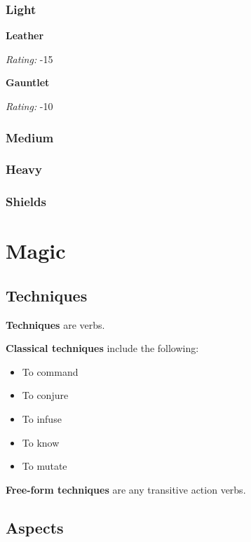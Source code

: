 \documentclass[12pt,]{article}
\providecommand{\tightlist}{%
  \setlength{\itemsep}{0pt}\setlength{\parskip}{0pt}}
\begin{document}
\subsubsection{Light}\label{light}

\textbf{Leather}

\emph{Rating:} -15

\textbf{Gauntlet}

\emph{Rating:} -10

\subsubsection{Medium}\label{medium}

\subsubsection{Heavy}\label{heavy}

\subsubsection{Shields}\label{shields}

\section{Magic}\label{magic}

\subsection{Techniques}\label{techniques}

\textbf{Techniques} are verbs.

\textbf{Classical techniques} include the following:

\begin{itemize}
\tightlist
\item
  To command
\item
  To conjure
\item
  To infuse
\item
  To know
\item
  To mutate
\end{itemize}

\textbf{Free-form techniques} are any transitive action verbs.

\subsection{Aspects}\label{aspects}
\end{document}
